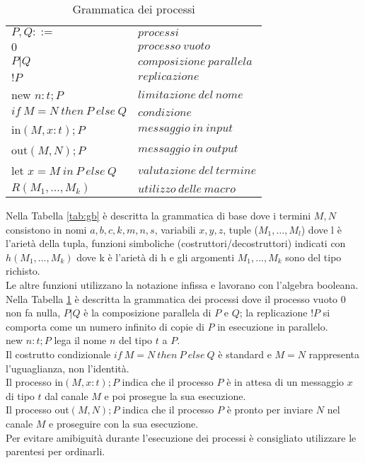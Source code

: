 \begin{table}[h!]
    \begin{tabular}{ll}
        
        $P, Q::=$ & $processi$\\
        \quad$0$ & $processo \: vuoto$\\
        \quad$P|Q$ & $composizione \: parallela$\\
        \quad$!P$ & $replicazione$\\
        \quad new $n:t;P$ & $limitazione \: del \: nome$\\
        \quad$if \: M = N \: then \: P \: else \: Q$ & $condizione$\\
        \quad in$(M,x:t);P$ & $messaggio \: in \: input$\\
        \quad out$(M,N);P$ & $messaggio \: in \: output$\\
        \quad let $x=M \: in \: P \: else  \: Q$ & $valutazione \: del \: termine$\\
        \quad $R(M_1,\dots,M_k)$ & $utilizzo \: delle \: macro$\\       
    \end{tabular}
    \caption{Grammatica dei processi}
    \label{tab:gp}
\end{table}

\noindent Nella Tabella \ref*{tab:gb} è descritta la grammatica di base dove i termini $M,N$ consistono in nomi $a, b, c, k, m, n, s$, variabili $x,y,z$, tuple ($M_1,\dots, M_l$) dove l è l'arietà della tupla, funzioni simboliche (costruttori/decostruttori) indicati con $h(M_1, \dots , M_k)$ dove k è l'arietà di h e gli argomenti $M_1,...,M_k$ sono del tipo richisto.\\
Le altre funzioni utilizzano la notazione infissa e lavorano con l'algebra booleana.\\
Nella Tabella \ref*{tab:gp} è descritta la grammatica dei processi dove il processo vuoto 0 non fa nulla, $P|Q$ è la composizione parallela di $P$ e $Q$; la replicazione $!P$ si comporta come un numero infinito di copie di $P$ in esecuzione in parallelo.\\ 
new $n:t;P$ lega il nome $n$ del tipo $t$ a $P$.\\
Il costrutto condizionale $if \: M = N \: then \: P \: else \: Q$ è standard e $M=N$ rappresenta l'uguaglianza, non l'identità.\\
Il processo in$(M,x:t);P$ indica che il processo $P$ è in attesa di un messaggio $x$ di tipo $t$ dal canale $M$ e poi prosegue la sua esecuzione.\\
Il processo out$(M,N);P$ indica che il processo $P$ è pronto per inviare $N$ nel canale $M$ e proseguire con la sua esecuzione.\\
Per evitare amibiguità durante l'esecuzione dei processi è consigliato utilizzare le parentesi per ordinarli.\\

